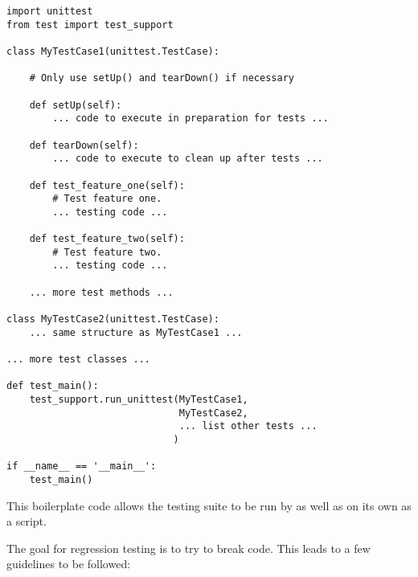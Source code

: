 \begin{verbatim}
import unittest
from test import test_support

class MyTestCase1(unittest.TestCase):

    # Only use setUp() and tearDown() if necessary

    def setUp(self):
        ... code to execute in preparation for tests ...

    def tearDown(self):
        ... code to execute to clean up after tests ...

    def test_feature_one(self):
        # Test feature one.
        ... testing code ...

    def test_feature_two(self):
        # Test feature two.
        ... testing code ...

    ... more test methods ...

class MyTestCase2(unittest.TestCase):
    ... same structure as MyTestCase1 ...

... more test classes ...

def test_main():
    test_support.run_unittest(MyTestCase1,
                              MyTestCase2,
                              ... list other tests ...
                             )

if __name__ == '__main__':
    test_main()
\end{verbatim}

This boilerplate code allows the testing suite to be run by
 as well as on its own as a script.

The goal for regression testing is to try to break code.
This leads to a few guidelines to be followed:


